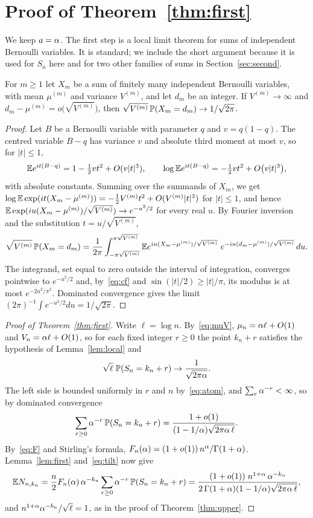 \section{Proof of Theorem~\ref{thm:first}}\label{sec:local}

We keep $a=\alpha$. The first step is a local limit theorem for sums of independent Bernoulli variables. It is
standard; we include the short argument because it is used for $S_n$ here and for two other families of sums in
Section~\ref{sec:second}.

\begin{lemma}\label{lem:local}
For $m\ge1$ let $X_m$ be a sum of finitely many independent Bernoulli variables, with mean $\mu^{(m)}$ and variance
$V^{(m)}$, and let $d_m$ be an integer. If $V^{(m)}\to\infty$ and $d_m-\mu^{(m)}=o\bigl(\sqrt{V^{(m)}}\bigr)$, then
$\sqrt{V^{(m)}}\,\mathbb{P}(X_m=d_m)\to1/\sqrt{2\pi}$.
\end{lemma}

\begin{proof}
Let $B$ be a Bernoulli variable with parameter $q$ and $v=q(1-q)$. The centred variable $B-q$ has variance $v$ and
absolute third moment at most $v$, so for $|t|\le1$,
\[
\mathbb{E} e^{it(B-q)}=1-\tfrac12vt^2+O(v|t|^3),\qquad
\log\mathbb{E} e^{it(B-q)}=-\tfrac12vt^2+O\bigl(v|t|^3\bigr),
\]
with absolute constants. Summing over the summands of $X_m$, we get
$\log\mathbb{E}\exp(it(X_m-\mu^{(m)}))=-\frac12V^{(m)}t^2+O(V^{(m)}|t|^3)$ for $|t|\le1$, and hence
$\mathbb{E}\exp(iu(X_m-\mu^{(m)})/\sqrt{V^{(m)}})\to e^{-u^2/2}$ for every real $u$. By Fourier inversion and the
substitution $t=u/\sqrt{V^{(m)}}$,
\[
\sqrt{V^{(m)}}\,\mathbb{P}(X_m=d_m)=\frac1{2\pi}\int_{-\pi\sqrt{V^{(m)}}}^{\pi\sqrt{V^{(m)}}}
\mathbb{E} e^{iu(X_m-\mu^{(m)})/\sqrt{V^{(m)}}}\;e^{-iu(d_m-\mu^{(m)})/\sqrt{V^{(m)}}}\,du .
\]
The integrand, set equal to zero outside the interval of integration, converges pointwise to $e^{-u^2/2}$ and, by~\eqref{eq:cf} and $\sin(|t|/2)\ge|t|/\pi$, its modulus is
at most $e^{-2u^2/\pi^2}$. Dominated convergence gives the limit $(2\pi)^{-1}\int e^{-u^2/2}du=1/\sqrt{2\pi}$.
\end{proof}

\begin{proof}[Proof of Theorem~\ref{thm:first}]
Write $\ell=\log n$. By~\eqref{eq:muV}, $\mu_n=\alpha\ell+O(1)$ and $V_n=\alpha\ell+O(1)$, so for each fixed integer
$r\ge0$ the point $k_n+r$ satisfies the hypothesis of Lemma~\ref{lem:local} and
\[
\sqrt{\ell}\;\mathbb{P}(S_n=k_n+r)\to\frac1{\sqrt{2\pi\alpha}} .
\]
The left side is bounded uniformly in $r$ and $n$ by~\eqref{eq:atom}, and $\sum_r\alpha^{-r}<\infty$, so by dominated
convergence
\[
\sum_{r\ge0}\alpha^{-r}\,\mathbb{P}(S_n=k_n+r)=\frac{1+o(1)}{(1-1/\alpha)\sqrt{2\pi\alpha\,\ell}} .
\]
By~\eqref{eq:F} and Stirling's formula, $F_n(\alpha)=(1+o(1))\,n^{\alpha}/\Gamma(1+\alpha)$. Lemma~\ref{lem:first}
and~\eqref{eq:tilt} now give
\[
\mathbb{E} N_{n,k_n}=\frac n2F_n(\alpha)\,\alpha^{-k_n}\sum_{r\ge0}\alpha^{-r}\,\mathbb{P}(S_n=k_n+r)
=\frac{(1+o(1))\;n^{1+\alpha}\,\alpha^{-k_n}}{2\,\Gamma(1+\alpha)(1-1/\alpha)\sqrt{2\pi\alpha\,\ell}} ,
\]
and $n^{1+\alpha}\alpha^{-b_n}/\sqrt{\ell}=1$, as in the proof of Theorem~\ref{thm:upper}.
\end{proof}

